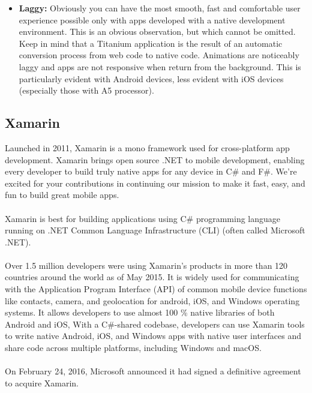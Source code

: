 \begin{itemize}
 \item \textbf{Laggy:}   Obviously you can have the most smooth, fast and comfortable user experience possible only with apps developed with a native development environment. This is an obvious observation, but which cannot be omitted. Keep in mind that a Titanium application is the result of an automatic conversion process from web code to native code. Animations are noticeably laggy and apps are not responsive when return from the background. This is particularly evident with Android devices, less evident with iOS devices (especially those with A5 processor).
\end{itemize}



\subsection{Xamarin}
Launched in 2011, Xamarin is a mono framework used for cross-platform app development. Xamarin brings open source .NET to mobile development, enabling every developer to build truly native apps for any device in C\# and F\#.
We’re excited for your contributions in continuing our mission to make it fast, easy, and fun to build great mobile apps.

\paragraph{}

Xamarin is best for building applications using C\# programming language running on .NET Common Language Infrastructure (CLI) (often called Microsoft .NET).
\paragraph{}
Over 1.5 million developers were using Xamarin's products in more than 120 countries around the world as of May 2015.
It is widely used for communicating with the Application Program Interface (API) of common mobile device functions like contacts, camera, and geolocation for android, iOS, and Windows operating systems.
It allows developers to use almost 100 \% native libraries of both Android and iOS, With a C\#-shared codebase, developers can use Xamarin tools to write native Android, iOS, and Windows apps with native user interfaces and share code across multiple platforms, including Windows and macOS.

\paragraph{}
On February 24, 2016, Microsoft announced it had signed a definitive agreement to acquire Xamarin.
